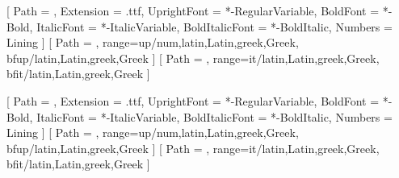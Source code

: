 \usepackage{iftex}
\ifXeTeX
  \usepackage{fontspec}
  \usepackage{unicode-math}
  \ifdefined\fontdir\else\def\fontdir{}\fi
  \setmainfont{PlusJakartaSans}[
    Path = \fontdir,
    Extension = .ttf,
    UprightFont = *-RegularVariable,
    BoldFont = *-Bold,
    ItalicFont = *-ItalicVariable,
    BoldItalicFont = *-BoldItalic,
    Numbers = Lining
  ]
  [
    Path = \fontdir,
    range={up/{num,latin,Latin,greek,Greek}, 
    	bfup/{latin,Latin,greek,Greek}}
  ]
  [
    Path = \fontdir,
    range={it/{latin,Latin,greek,Greek}, 
    	bfit/{latin,Latin,greek,Greek}}
  ]
\else\ifLuaTeX
  \usepackage{fontspec}
  \usepackage{unicode-math}
  \ifdefined\fontdir\else\def\fontdir{}\fi
  \setmainfont{PlusJakartaSans}[
    Path = \fontdir,
    Extension = .ttf,
    UprightFont = *-RegularVariable,
    BoldFont = *-Bold,
    ItalicFont = *-ItalicVariable,
    BoldItalicFont = *-BoldItalic,
    Numbers = Lining
  ]
  [
    Path = \fontdir,
    range={up/{num,latin,Latin,greek,Greek}, 
    	bfup/{latin,Latin,greek,Greek}}
  ]
  [
    Path = \fontdir,
    range={it/{latin,Latin,greek,Greek}, 
    	bfit/{latin,Latin,greek,Greek}}
  ]
\else
  \usepackage{lmodern}
\fi\fi